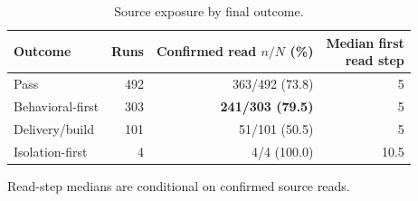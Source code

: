 \begin{table}[tbp]
  \centering
    \caption{Source exposure by final outcome.}
    \label{tab:source-exposure}

    \centering
    \footnotesize

    \begin{tabular}{@{}lrrr@{}}
      \toprule
      Outcome
        & Runs
        & \shortstack{Confirmed read\\$n/N$ (\%)}
        & \shortstack{Median first\\read step} \\
      \midrule
      Pass & 492 & 363/492 (73.8) & 5 \\
      Behavioral-first & 303 & \textbf{241/303 (79.5)} & 5 \\
      Delivery/build & 101 & 51/101 (50.5) & 5 \\
      Isolation-first & 4 & 4/4 (100.0) & 10.5 \\

      \bottomrule
    \end{tabular}

    \par\smallskip
    {\scriptsize
    Read-step medians are conditional on confirmed source reads.
    }
\end{table}
